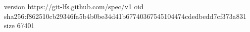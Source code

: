 version https://git-lfs.github.com/spec/v1
oid sha256:f862510cb29346fa5b4b0be34d41b67740367545104474cdedbedd7cf373a831
size 67401
